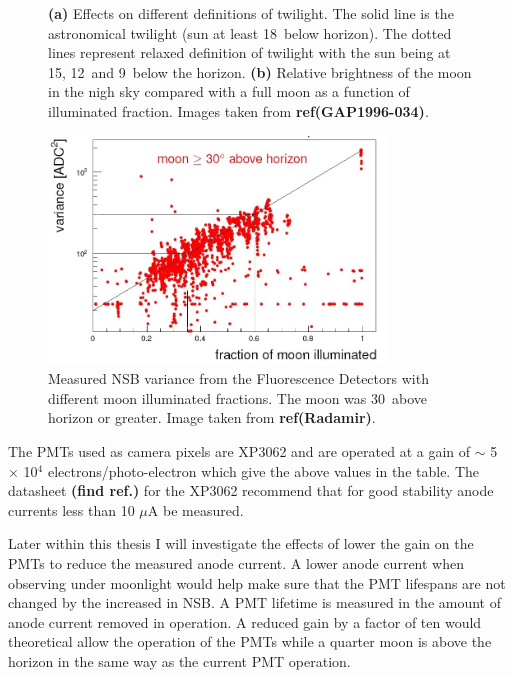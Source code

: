 \begin{figure}
\begin{subfigure}[b]{0.45\textwidth}
\caption{}
\end{subfigure}
\caption{\textbf{(a)} Effects on different definitions of twilight. The solid line is the astronomical twilight (sun at least 18\textdegree \ below horizon). The dotted lines represent relaxed definition of twilight with the sun being at 15\textdegree , 12\textdegree \ and 9\textdegree \ below the horizon. \textbf{(b)} Relative brightness of the moon in the nigh sky compared with a full moon as a function of illuminated fraction. Images taken from \textbf{ref{(GAP1996-034)}}. }
\end{figure}

\begin{figure}
\centering
\includegraphics[width=0.8\textwidth]{chapters/pix/SelEff/BGLoop_Variance_crop.jpg}
\caption{Measured NSB variance from the Fluorescence Detectors with different moon illuminated fractions. The moon was 30\textdegree \ above horizon or greater. Image taken from \textbf{ref(Radamir)}.}
\end{figure}

The PMTs used as camera pixels are XP3062 and are operated at a gain of $\sim$ 5 $\times$ 10$^4$ electrons/photo-electron which give the above values in the table. The datasheet \textbf{(find ref.)} for the XP3062 recommend that for good stability anode currents less than 10 $\mu$A be measured. 
  
Later within this thesis I will investigate the effects of lower the gain on the PMTs to reduce the measured anode current. A lower anode current when observing under moonlight would help make sure that the PMT lifespans are not changed by the increased in NSB. A PMT lifetime is measured in the amount of anode current removed in operation. A reduced gain by a factor of ten would theoretical allow the operation of the PMTs while a quarter moon is above the horizon in the same way as the current PMT operation.  

